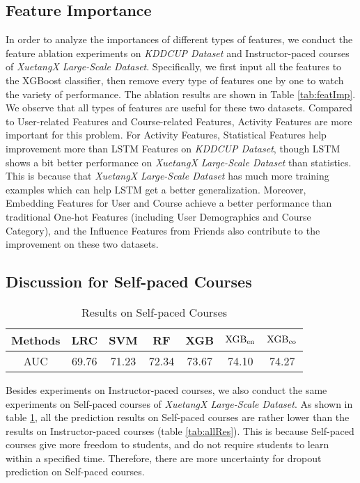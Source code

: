 	\subsection{Feature Importance}
	In order to analyze the importances of different types of features, we conduct the feature ablation experiments on \textit{KDDCUP Dataset} and Instructor-paced courses of \textit{XuetangX Large-Scale Dataset}. Specifically, we first input all the features to the XGBoost classifier, then remove every type of features one by one to watch the variety of performance.
	The ablation results are shown in Table \ref{tab:featImp}. We observe that all types of features are useful for these two datasets. Compared to User-related Features and Course-related Features, Activity Features are more important for this problem. For Activity Features, Statistical Features help improvement more than LSTM Features on \textit{KDDCUP Dataset}, though LSTM shows a bit better performance on \textit{XuetangX Large-Scale Dataset} than statistics. This is because that \textit{XuetangX Large-Scale Dataset} has much more training examples which can help LSTM get a better generalization. Moreover, Embedding Features for User and Course achieve a better performance than traditional One-hot Features (including User Demographics and Course Category), and the Influence Features from Friends also contribute to the improvement on these two datasets.
	\subsection{Discussion for Self-paced Courses}
	
		\begin{table}
		\centering
		\caption{Results on Self-paced Courses }
		\begin{tabular}{ccccccc}
			\hline
			\hline
			Methods & LRC & SVM &RF & XGB &$\rm XGB_{en}$& $\rm XGB_{co}$ \\
			\hline
			AUC    & 69.76 & 71.23 & 72.34 &73.67 & 74.10 & 74.27 \\
			\hline
			\hline		
		\end{tabular}

		\label{tab:selfRes}
	\end{table}
	Besides experiments on Instructor-paced courses, we also conduct the same experiments on Self-paced courses of \textit{XuetangX Large-Scale Dataset}. As shown in table \ref{tab:selfRes}, all the prediction results on Self-paced courses are rather lower than the results on Instructor-paced courses (table \ref{tab:allRes}). This is because Self-paced courses give more freedom to students, and do not require students to learn within a specified time. Therefore, there are more uncertainty for dropout prediction on Self-paced courses.


